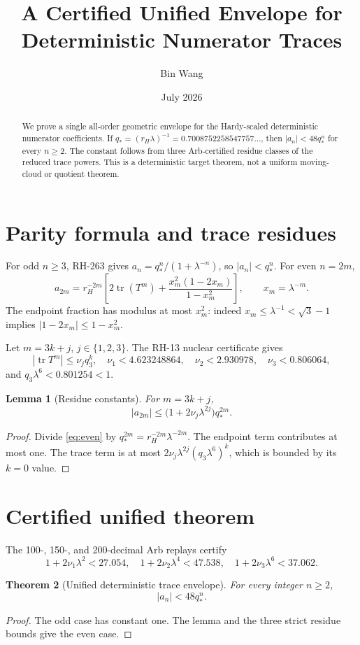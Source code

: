\documentclass[11pt]{article}
\title{A Certified Unified Envelope for Deterministic Numerator Traces}\author{Bin Wang}\date{July 2026}
\newtheorem{theorem}{Theorem}[section]\newtheorem{lemma}[theorem]{Lemma}\theoremstyle{remark}\newtheorem{remark}[theorem]{Remark}
\begin{document}
\maketitle
\begin{abstract}
We prove a single all-order geometric envelope for the Hardy-scaled
deterministic numerator coefficients.  If
$q_*=(r_H\lambda)^{-1}=0.7008752258547757\ldots$, then
$|a_n|<48q_*^n$ for every $n\ge2$.  The constant follows from three
Arb-certified residue classes of the reduced trace powers.  This is a
deterministic target theorem, not a uniform moving-cloud or quotient theorem.
\end{abstract}

\section{Parity formula and trace residues}
For odd $n\ge3$, RH-263 gives
$a_n=q_*^n/(1+\lambda^{-n})$, so $|a_n|<q_*^n$.  For even $n=2m$,
\begin{equation}
 a_{2m}=r_H^{-2m}\left[2\operatorname{tr}(T^m)+
 \frac{x_m^2(1-2x_m)}{1-x_m^2}\right],\qquad x_m=\lambda^{-m}.
 \label{eq:even}
\end{equation}
The endpoint fraction has modulus at most $x_m^2$: indeed
$x_m\le\lambda^{-1}<\sqrt3-1$ implies
$|1-2x_m|\le1-x_m^2$.

Let $m=3k+j$, $j\in\{1,2,3\}$.  The RH-13 nuclear certificate
\citep{WangRH13} gives
\[
 |\operatorname{tr}T^m|\le\nu_j q_3^k,
 \quad
 \nu_1<4.623248864,\quad\nu_2<2.930978,\quad\nu_3<0.806064,
\]
and $q_3\lambda^6<0.801254<1$.

\begin{lemma}[Residue constants]
For $m=3k+j$,
\[
 |a_{2m}|\le\bigl(1+2\nu_j\lambda^{2j}\bigr)q_*^{2m}.
\]
\end{lemma}
\begin{proof}
Divide \eqref{eq:even} by $q_*^{2m}=r_H^{-2m}\lambda^{-2m}$.
The endpoint term contributes at most one.  The trace term is at most
$2\nu_j\lambda^{2j}(q_3\lambda^6)^k$, which is bounded by its $k=0$ value.
\end{proof}

\section{Certified unified theorem}
The 100-, 150-, and 200-decimal Arb replays certify
\[
 1+2\nu_1\lambda^2<27.054,\quad
 1+2\nu_2\lambda^4<47.538,\quad
 1+2\nu_3\lambda^6<37.062.
\]
\begin{theorem}[Unified deterministic trace envelope]
For every integer $n\ge2$,
\[
 \boxed{|a_n|<48q_*^n.}
\]
\end{theorem}
\begin{proof}
The odd case has constant one.  The lemma and the three strict residue bounds
give the even case.
\end{proof}
\end{document}
